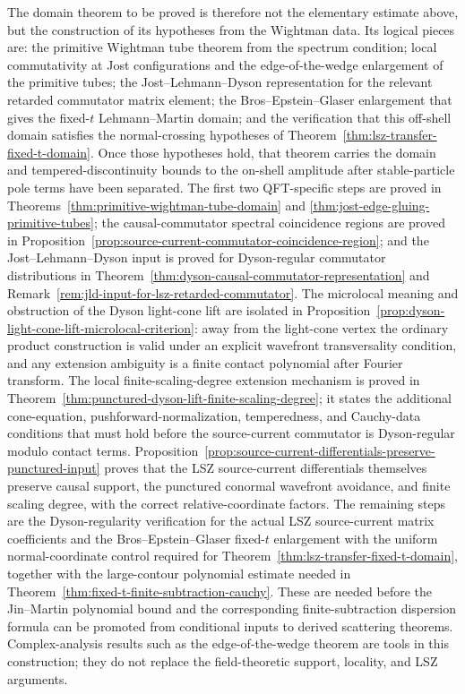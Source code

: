 The domain theorem to be proved is therefore not the elementary estimate
above, but the construction of its hypotheses from the Wightman data.  Its
logical pieces are: the primitive Wightman tube theorem from the spectrum
condition; local commutativity at Jost configurations and the
edge-of-the-wedge enlargement of the primitive tubes; the
Jost--Lehmann--Dyson representation for the relevant retarded commutator
matrix element; the Bros--Epstein--Glaser enlargement that gives the
fixed-\(t\) Lehmann--Martin domain; and the verification that this off-shell
domain satisfies the normal-crossing hypotheses of
Theorem~\ref{thm:lsz-transfer-fixed-t-domain}.  Once those hypotheses hold,
that theorem carries the domain and tempered-discontinuity bounds to the
on-shell amplitude after stable-particle pole terms have been separated.  The
first two QFT-specific
steps are proved in
Theorems~\ref{thm:primitive-wightman-tube-domain} and
\ref{thm:jost-edge-gluing-primitive-tubes}; the causal-commutator
spectral coincidence regions are proved in
Proposition~\ref{prop:source-current-commutator-coincidence-region}; and the
Jost--Lehmann--Dyson input is proved for Dyson-regular commutator
distributions in
Theorem~\ref{thm:dyson-causal-commutator-representation} and
Remark~\ref{rem:jld-input-for-lsz-retarded-commutator}.  The microlocal
meaning and obstruction of the Dyson light-cone lift are isolated in
Proposition~\ref{prop:dyson-light-cone-lift-microlocal-criterion}: away from
the light-cone vertex the ordinary product construction is valid under an
explicit wavefront transversality condition, and any extension ambiguity is a
finite contact polynomial after Fourier transform.  The local
finite-scaling-degree extension mechanism is proved in
Theorem~\ref{thm:punctured-dyson-lift-finite-scaling-degree}; it states the
additional cone-equation, pushforward-normalization, temperedness, and
Cauchy-data conditions that must hold before the source-current commutator is
Dyson-regular modulo contact terms.
Proposition~\ref{prop:source-current-differentials-preserve-punctured-input}
proves that the LSZ source-current differentials themselves preserve causal
support, the punctured conormal wavefront avoidance, and finite scaling
degree, with the correct relative-coordinate factors.  The remaining steps
are the
Dyson-regularity verification for the actual LSZ source-current matrix
coefficients and the Bros--Epstein--Glaser
fixed-\(t\) enlargement with the uniform normal-coordinate control required
for Theorem~\ref{thm:lsz-transfer-fixed-t-domain}, together with the
large-contour polynomial estimate needed in
Theorem~\ref{thm:fixed-t-finite-subtraction-cauchy}.  These are needed before
the Jin--Martin polynomial bound and the corresponding finite-subtraction
dispersion formula can be promoted from conditional inputs to derived
scattering theorems.
Complex-analysis results such as the
edge-of-the-wedge theorem are tools in this construction; they do not replace
the field-theoretic support, locality, and LSZ arguments.

